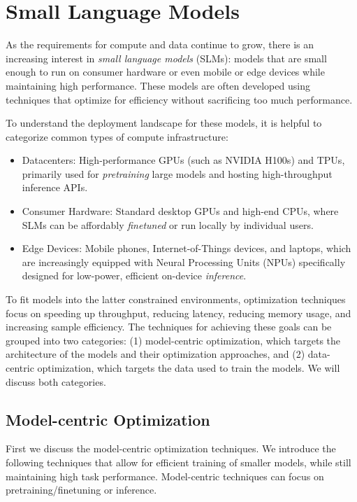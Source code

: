 \section{Small Language Models}
\label{sec:small-models}
As the requirements for compute and data continue to grow, there is an increasing interest in \emph{small language models} (SLMs): models that are small enough to run on consumer hardware or even mobile or edge devices while maintaining high performance. These models are often developed using techniques that optimize for efficiency without sacrificing too much performance.

To understand the deployment landscape for these models, it is helpful to categorize common types of compute infrastructure:
\begin{itemize}
    \item Datacenters: High-performance GPUs (such as NVIDIA H100s) and TPUs, primarily used for {\em pretraining} large models and hosting high-throughput inference APIs.
    
    \item Consumer Hardware: Standard desktop GPUs and high-end CPUs, where SLMs can be affordably {\em finetuned} or run locally by individual users.
    
    \item Edge Devices: Mobile phones, Internet-of-Things devices, and laptops, which are increasingly equipped with Neural Processing Units (NPUs) specifically designed for low-power, efficient on-device {\em inference}.
\end{itemize}

To fit models into the latter constrained environments, optimization techniques  focus on speeding up throughput, reducing latency, reducing memory usage, and increasing sample efficiency. The techniques for achieving these goals can be grouped into two categories: (1) model-centric optimization, which targets the architecture of the models and their optimization approaches, and (2) data-centric optimization, which targets the data used to train the models. We will discuss both categories.

\subsection{Model-centric Optimization}
First we discuss the model-centric optimization techniques. 
We introduce the following techniques that allow for efficient training of smaller models, while still maintaining high task performance.
Model-centric techniques can focus on pretraining/finetuning or inference.

